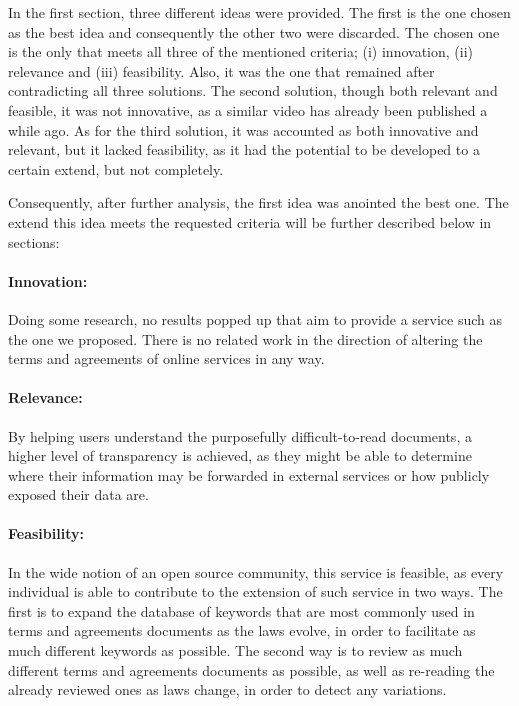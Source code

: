 In the first section, three different ideas were provided. The first is the one 
chosen as the best idea and consequently the other two were discarded. The 
chosen one is the only that meets all three of the mentioned criteria; 
(i) innovation, (ii) relevance and (iii) feasibility. Also, it was the one that 
remained after contradicting all three solutions. 
The second solution, though both relevant and feasible, it was not innovative, 
as a similar video has already been published a while ago. As for the third 
solution, it was accounted as both innovative and relevant, but it lacked 
feasibility, as it had the potential to be developed to a certain extend, but 
not completely.

Consequently, after further analysis, the first idea was anointed the best one. 
The extend this idea meets the requested criteria will be further described 
below in sections:
\paragraph{Innovation:} Doing some research, no results popped up that aim to 
provide a service such as the one we proposed. There is no related work in the 
direction of altering the terms and agreements of online services in any way.
\paragraph{Relevance:} By helping users understand the purposefully 
difficult-to-read documents, a higher level of transparency is achieved, as they 
might be able to determine where their information may be forwarded in external 
services or how publicly exposed their data are. 
\paragraph{Feasibility:} In the wide notion of an open source community, this 
service is feasible, as every individual is able to contribute to the extension 
of such service in two ways. The first is to expand the database of keywords 
that are most commonly used in terms and agreements documents as the laws 
evolve, in order to facilitate as much different keywords as possible. The 
second way is to review as much different terms and agreements documents as 
possible, as well as re-reading the already reviewed ones as laws change, in 
order to detect any variations.


